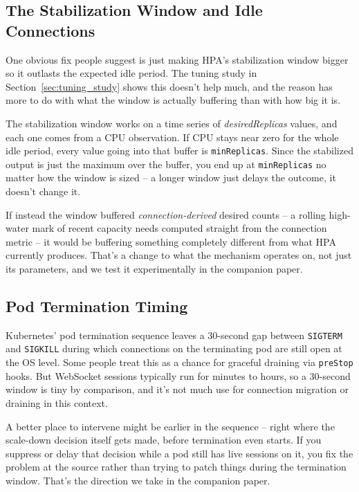 \documentclass[twocolumn]{svjour3}
\begin{document}
\subsection{The Stabilization Window and Idle Connections}

One obvious fix people suggest is just making HPA's stabilization window bigger so
it outlasts the expected idle period. The tuning study in
Section~\ref{sec:tuning_study} shows this doesn't help much, and the reason has
more to do with what the window is actually buffering than with how big it is.

The stabilization window works on a time series of \textit{desiredReplicas}
values, and each one comes from a CPU observation. If CPU stays near zero for the
whole idle period, every value going into that buffer is \texttt{minReplicas}.
Since the stabilized output is just the maximum over the buffer, you end up at
\texttt{minReplicas} no matter how the window is sized -- a longer window just
delays the outcome, it doesn't change it.

If instead the window buffered \textit{connection-derived} desired counts -- a
rolling high-water mark of recent capacity needs computed straight from the
connection metric -- it would be buffering something completely different from
what HPA currently produces. That's a change to what the mechanism operates on,
not just its parameters, and we test it experimentally in the companion paper.

\subsection{Pod Termination Timing}

Kubernetes' pod termination sequence leaves a 30-second gap between
\texttt{SIGTERM} and \texttt{SIGKILL} during which connections on the terminating
pod are still open at the OS level. Some people treat this as a chance for
graceful draining via \texttt{preStop} hooks. But WebSocket sessions typically run
for minutes to hours, so a 30-second window is tiny by comparison, and it's not
much use for connection migration or draining in this context.

A better place to intervene might be earlier in the sequence -- right where the
scale-down decision itself gets made, before termination even starts. If you
suppress or delay that decision while a pod still has live sessions on it, you fix
the problem at the source rather than trying to patch things during the
termination window. That's the direction we take in the companion paper.
\end{document}
